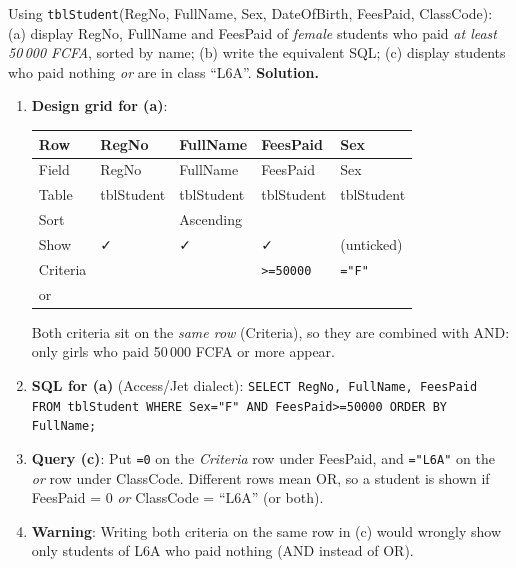 \documentclass[11pt]{article}
\begin{document}
\begin{exoresolu}
Using \texttt{tblStudent}(RegNo, FullName, Sex, DateOfBirth, FeesPaid, ClassCode): (a) display RegNo, FullName and FeesPaid of \emph{female} students who paid \emph{at least 50\,000 FCFA}, sorted by name; (b) write the equivalent SQL; (c) display students who paid nothing \emph{or} are in class ``L6A''.
\tcblower
\textbf{Solution.}
\begin{enumerate}
\item \textbf{Design grid for (a)}:
\begin{center}
\begin{tabularx}{\linewidth}{|l|X|X|X|X|}
\hline
\rowcolor{popblueL} \textbf{Row} & \textbf{RegNo} & \textbf{FullName} & \textbf{FeesPaid} & \textbf{Sex} \\
\hline
Field & RegNo & FullName & FeesPaid & Sex \\
\hline
Table & tblStudent & tblStudent & tblStudent & tblStudent \\
\hline
Sort & & Ascending & & \\
\hline
Show & ✓ & ✓ & ✓ & (unticked) \\
\hline
Criteria & & & \texttt{>=50000} & \texttt{="F"} \\
\hline
or & & & & \\
\hline
\end{tabularx}
\end{center}
Both criteria sit on the \emph{same row} (Criteria), so they are combined with AND: only girls who paid 50\,000 FCFA or more appear.
\item \textbf{SQL for (a)} (Access/Jet dialect):
\texttt{SELECT RegNo, FullName, FeesPaid FROM tblStudent WHERE Sex="F" AND FeesPaid>=50000 ORDER BY FullName;}
\item \textbf{Query (c)}: Put \texttt{=0} on the \emph{Criteria} row under FeesPaid, and \texttt{="L6A"} on the \emph{or} row under ClassCode. Different rows mean OR, so a student is shown if FeesPaid = 0 \emph{or} ClassCode = ``L6A'' (or both).
\item \textbf{Warning}: Writing both criteria on the same row in (c) would wrongly show only students of L6A who paid nothing (AND instead of OR).
\end{enumerate}
\end{exoresolu}
\end{document}
